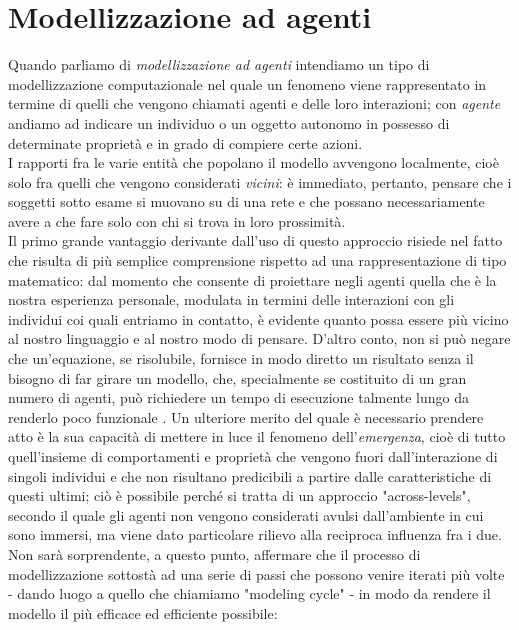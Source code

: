 \section{Modellizzazione ad agenti}
Quando parliamo di \emph{modellizzazione ad agenti} intendiamo un tipo di modellizzazione computazionale nel quale un fenomeno viene rappresentato in termine di quelli che vengono chiamati agenti e delle loro interazioni; con \emph{agente} andiamo ad indicare un individuo o un oggetto autonomo in possesso di determinate proprietà e in grado di compiere certe azioni. \\I rapporti fra le varie entità che popolano il modello avvengono localmente, cioè solo fra quelli che vengono considerati \emph{vicini}: è immediato, pertanto, pensare che i soggetti sotto esame si muovano su di una rete e che possano necessariamente avere a che fare solo con chi si trova in loro prossimità. \\ Il primo grande vantaggio derivante dall'uso di questo approccio risiede nel fatto che risulta di più semplice comprensione rispetto ad una rappresentazione di tipo matematico: dal momento che consente di proiettare negli agenti quella che è la nostra esperienza personale, modulata in termini delle interazioni con gli individui coi quali entriamo in contatto, è evidente quanto possa essere più vicino al nostro linguaggio e al nostro modo di pensare. D'altro conto, non si può negare che un'equazione, se risolubile, fornisce in modo diretto un risultato senza il bisogno di far girare un modello, che, specialmente se costituito di un gran numero di agenti, può richiedere un tempo di esecuzione talmente lungo da renderlo poco funzionale \cite{Rand}. Un ulteriore merito del quale è necessario prendere atto è la sua capacità di mettere in luce il fenomeno dell'\emph{emergenza}, cioè di tutto quell'insieme di comportamenti e proprietà che vengono fuori dall'interazione di singoli individui e che non risultano predicibili a partire dalle caratteristiche di questi ultimi; ciò è possibile perché si tratta di un approccio "across-levels", secondo il quale gli agenti non vengono considerati avulsi dall'ambiente in cui sono immersi, ma viene dato particolare rilievo alla reciproca influenza fra i due. \\ Non sarà sorprendente, a questo punto, affermare che il processo di modellizzazione sottostà ad una serie di passi che possono venire iterati più volte - dando luogo a quello che chiamiamo "modeling cycle" - in modo da rendere il modello il più efficace ed efficiente possibile:
